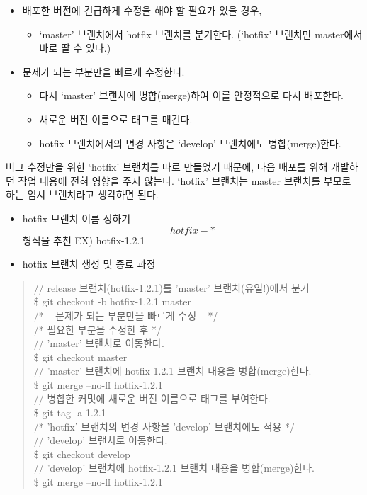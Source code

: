 \documentclass[12pt, a4paper, oneside]{book}
\begin{document}
			\begin{itemize}
			\item 배포한 버전에 긴급하게 수정을 해야 할 필요가 있을 경우,
				\begin{itemize}
					\item ‘master’ 브랜치에서 hotfix 브랜치를 분기한다. (‘hotfix’ 브랜치만 master에서 바로 딸 수 있다.)
				\end{itemize}
			\item 문제가 되는 부분만을 빠르게 수정한다.
				\begin{itemize}
					\item 다시 ‘master’ 브랜치에 병합(merge)하여 이를 안정적으로 다시 배포한다.
					\item 새로운 버전 이름으로 태그를 매긴다.
					\item hotfix 브랜치에서의 변경 사항은 ‘develop’ 브랜치에도 병합(merge)한다.
				\end{itemize}
			\end{itemize}
			
			
			버그 수정만을 위한 ‘hotfix’ 브랜치를 따로 만들었기 때문에, 다음 배포를 위해 개발하던 작업 내용에 전혀 영향을 주지 않는다. ‘hotfix’ 브랜치는 master 브랜치를 부모로 하는 임시 브랜치라고 생각하면 된다.
			
				\begin{itemize}
					\item hotfix 브랜치 이름 정하기 \\
							\[hotfix-* \] 형식을 추천 EX) hotfix-1.2.1
					\item hotfix 브랜치 생성 및 종료 과정
				\end{itemize}



		\begin{tcolorbox}
		\begin{quote}
			// release 브랜치(hotfix-1.2.1)를 'master' 브랜치(유일!)에서 분기\\
			\$ git checkout -b hotfix-1.2.1 master \\
			/* ~ 문제가 되는 부분만을 빠르게 수정 ~ */ \\
			/* 필요한 부분을 수정한 후 */ \\
			// 'master' 브랜치로 이동한다.  \\
			\$ git checkout master \\
			// 'master' 브랜치에 hotfix-1.2.1 브랜치 내용을 병합(merge)한다.  \\
			\$ git merge --no-ff hotfix-1.2.1 \\
			// 병합한 커밋에 새로운 버전 이름으로 태그를 부여한다. \\
			\$ git tag -a 1.2.1  \\
			/* 'hotfix' 브랜치의 변경 사항을 'develop' 브랜치에도 적용 */  \\
			// 'develop' 브랜치로 이동한다.  \\
			\$ git checkout develop  \\
			// 'develop' 브랜치에 hotfix-1.2.1 브랜치 내용을 병합(merge)한다.  \\
			\$ git merge --no-ff hotfix-1.2.1  \\
		\end{quote}
		\end{tcolorbox}
\end{document}
